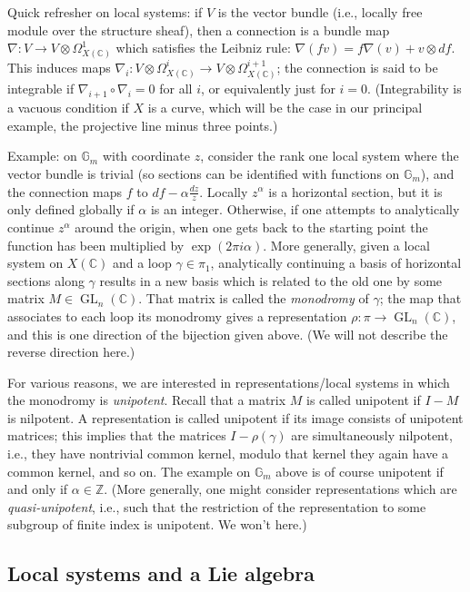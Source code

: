 \documentclass[12pt]{article}
\def\CC{\mathbb{C}}
\def\GG{\mathbb{G}}
\def\ZZ{\mathbb{Z}}
\DeclareMathOperator{\GL}{GL}
\begin{document}
Quick refresher on local systems: if
$V$ is the vector bundle (i.e., locally free module over the structure sheaf),
then a connection is a bundle map
$\nabla: V \to V \otimes \Omega^1_{X(\CC)}$ which satisfies the
Leibniz rule: $\nabla(fv) = f \nabla(v) + v \otimes df$. This induces
maps $\nabla_i: V \otimes \Omega^i_{X(\CC)} \to
V \otimes \Omega^{i+1}_{X(\CC)}$; the connection is said to be integrable
if $\nabla_{i+1} \circ \nabla_i = 0$ for all $i$, or equivalently just for
$i=0$. (Integrability is a vacuous condition if $X$ is a curve, which will
be the case in our principal example, the projective line minus three points.)

Example: on $\GG_m$ with coordinate $z$,
consider the rank one local system where the
vector bundle is trivial (so sections can be identified with functions
on $\GG_m$), and the connection maps $f$ to $df - \alpha
\frac{dz}{z}$. Locally $z^\alpha$ is a horizontal section, but it is only
defined globally if $\alpha$ is an integer. Otherwise, if one attempts to
analytically continue $z^\alpha$ around the origin, when one gets back to
the starting point the function has been multiplied by $\exp(2 \pi i \alpha)$.
More generally, given a local system on $X(\CC)$ and a loop $\gamma \in \pi_1$,
analytically continuing a basis of horizontal sections along $\gamma$ results
in a new basis which is related to the old one by some matrix
$M \in \GL_n(\CC)$. That matrix is called the \emph{monodromy} of
$\gamma$; the map that associates to each loop its monodromy gives a
representation $\rho: \pi \to \GL_n(\CC)$, and this is one direction
of the bijection given above.
(We will not describe the reverse direction here.)

For various reasons, we are interested in representations/local systems
in which the monodromy is \emph{unipotent}. Recall that a matrix $M$
is called unipotent if $I-M$ is nilpotent. A representation is called
unipotent if its image consists of unipotent matrices; this implies that
the matrices $I - \rho(\gamma)$ are simultaneously nilpotent, i.e., they
have nontrivial common
kernel, modulo that kernel they again have a common kernel, and
so on. The example on $\GG_m$ above is of course unipotent if and only
if $\alpha \in \ZZ$. (More generally, one might consider representations
which are \emph{quasi-unipotent}, i.e., such that the restriction of the
representation to some subgroup of finite index is unipotent. We won't here.)

\subsection*{Local systems and a Lie algebra}
\end{document}
